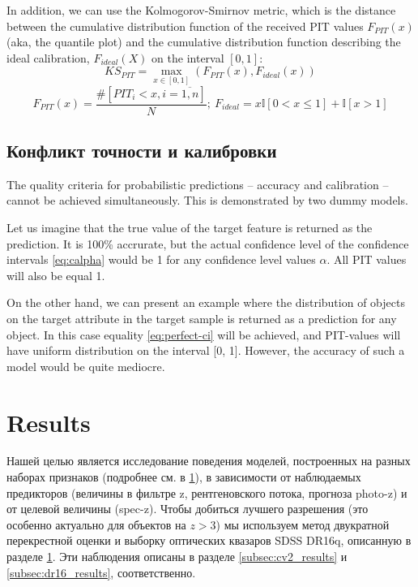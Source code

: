 \documentclass[fleqn,usenatbib]{mnras}
\begin{document}
In addition, we can use the Kolmogorov-Smirnov metric, which is the distance between the cumulative distribution function of the received PIT values \(F_{PIT}(x)\) (aka, the quantile plot) and the cumulative distribution function describing the ideal calibration, \(F_{ideal}(X)\) on the interval \([0,1]\):
\begin{equation}\label{eq:kspit}
    KS_{PIT} = \max_{x \in [0,1]}(F_{PIT}(x), F_{ideal}(x))
\end{equation}{}
\begin{equation}
    F_{PIT}(x) = \frac{\#[PIT_i < x, i=\overline{1,n}]}{N}; ~ F_{ideal} = x\mathbb{I}[0 < x \leq 1] + \mathbb{I}[x > 1]
\end{equation}{}

\subsection{Конфликт точности и калибровки}\label{sec:quality-conflict}
The quality criteria for probabilistic predictions -- accuracy and calibration -- cannot be achieved simultaneously. This is demonstrated by two dummy models.

Let us imagine that the true value of the target feature is returned as the prediction. It is 100\% accrurate, but the actual confidence level of the confidence intervals \eqref{eq:calpha} would be 1 for any confidence level values $\alpha$. All PIT values will also be equal 1.

On the other hand, we can present an example where the distribution of objects on the target attribute in the target sample is returned as a prediction for any object. In this case equality \eqref{eq:perfect-ci} will be achieved, and PIT-values will have uniform distribution on the interval [0, 1]. However, the accuracy of such a model would be quite mediocre.


\section{Results}

Нашей целью является исследование поведения моделей, построенных на разных наборах признаков (подробнее см. в \ref{}), в зависимости от наблюдаемых предикторов (величины в фильтре z, рентгеновского потока, прогноза photo-z) и от целевой величины (spec-z). Чтобы добиться лучшего разрешения (это особенно актуально для объектов на $z > 3$) мы используем метод двукратной перекрестной оценки и выборку оптических квазаров SDSS DR16q, описанную в разделе \ref{}. Эти наблюдения описаны в разделе \ref{subsec:cv2_results} и \ref{subsec:dr16_results}, соответственно.
\end{document}
